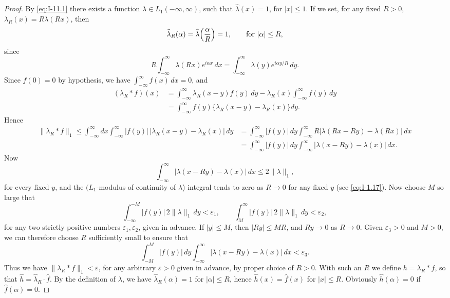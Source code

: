 \begin{proof}
By \eqref{eq:I-11.1} there exists a function $\lambda\in L_1(-\infty,\infty)$, such that $\widehat\lambda(x)=1$, for $|x|\le 1$. If we set, for any fixed $R>0$, $\lambda_R(x)=R\lambda(Rx)$, then
\begin{equation*}
\widehat\lambda_R(\alpha)=\widehat\lambda\Bigl(\frac{\alpha}{R}\Bigr)=1,\qquad\text{for }|\alpha|\le R,
\end{equation*}
since
\begin{equation*}
R\int_{-\infty}^{\infty}\lambda(Rx)e^{i\alpha x}\,dx=\int_{-\infty}^{\infty}\lambda(y)e^{i\alpha y/R}\,dy.
\end{equation*}
Since $\widehat f(0)=0$ by hypothesis, we have $\int_{-\infty}^{\infty}f(x)\,dx=0$, and
\begin{equation*}
\begin{aligned}
(\lambda_R*f)(x) &= \int_{-\infty}^{\infty}\lambda_R(x-y)f(y)\,dy-\lambda_R(x)\int_{-\infty}^{\infty}f(y)\,dy\\
&= \int_{-\infty}^{\infty}f(y)\bigl\{\lambda_R(x-y)-\lambda_R(x)\bigr\}dy.
\end{aligned}
\end{equation*}
Hence
\begin{equation*}
\begin{aligned}
\|\lambda_R*f\|_1
\le\int_{-\infty}^{\infty}dx\int_{-\infty}^{\infty}|f(y)|\,|\lambda_R(x-y)-\lambda_R(x)|\,dy &= \int_{-\infty}^{\infty}|f(y)|\,dy\int_{-\infty}^{\infty}R|\lambda(Rx-Ry)-\lambda(Rx)|\,dx\\
&= \int_{-\infty}^{\infty}|f(y)|\,dy\int_{-\infty}^{\infty}|\lambda(x-Ry)-\lambda(x)|\,dx.
\end{aligned}
\end{equation*}
Now
\begin{equation*}
\int_{-\infty}^{\infty}|\lambda(x-Ry)-\lambda(x)|\,dx\le 2\|\lambda\|_1,
\end{equation*}
for every fixed $y$, and the $(L_1$-modulus of continuity of $\lambda$) integral tends to zero as $R\to 0$ for any fixed $y$ (see \eqref{eq:I-1.17}). Now choose $M$ so large that
\begin{equation*}
\int_{-\infty}^{-M}|f(y)|\,2\|\lambda\|_1\,dy<\varepsilon_1,\qquad
\int_{M}^{\infty}|f(y)|\,2\|\lambda\|_1\,dy<\varepsilon_2,
\end{equation*}
for any two strictly positive numbers $\varepsilon_1,\varepsilon_2$, given in advance. If $|y|\le M$, then $|Ry|\le MR$, and $Ry\to 0$ as $R\to 0$. Given $\varepsilon_3>0$ and $M>0$, we can therefore choose $R$ sufficiently small to ensure that
\begin{equation*}
\int_{-M}^{M}|f(y)|\,dy\int_{-\infty}^{\infty}|\lambda(x-Ry)-\lambda(x)|\,dx<\varepsilon_3.
\end{equation*}
Thus we have $\|\lambda_R*f\|_1<\varepsilon$, for any arbitrary $\varepsilon>0$ given in advance, by proper choice of $R>0$. With such an $R$ we define $h=\lambda_R*f$, so that $\widehat h=\widehat\lambda_R\cdot\widehat f$. By the definition of $\lambda$, we have $\widehat\lambda_R(\alpha)=1$ for $|\alpha|\le R$, hence $\widehat h(x)=\widehat f(x)$ for $|x|\le R$. Obviously $\widehat h(\alpha)=0$ if $\widehat f(\alpha)=0$.
\end{proof}

